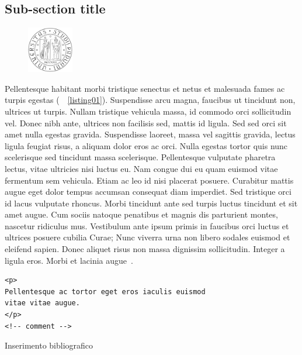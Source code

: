 \documentclass[a4paper,12pt,twoside,openright]{book}
\begin{document}
\subsection{Sub-section title}
\begin{figure}
  \vspace{-20pt}
  \begin{center}
  \includegraphics[width=2cm]{images/unipd-bn}
  \end{center}
  \vspace{-10pt}
\end{figure}

Pellentesque habitant morbi tristique senectus et netus et malesuada fames ac turpis egestas (\seename\ \lstlistingname~\ref{listing01}). Suspendisse arcu magna, faucibus ut tincidunt non, ultrices ut turpis. Nullam tristique vehicula massa, id commodo orci sollicitudin vel. Donec nibh ante, ultrices non facilisis sed, mattis id ligula. Sed sed orci sit amet nulla egestas gravida. Suspendisse laoreet, massa vel sagittis gravida, lectus ligula feugiat risus, a aliquam dolor eros ac orci. Nulla egestas tortor quis nunc scelerisque sed tincidunt massa scelerisque. Pellentesque vulputate pharetra lectus, vitae ultricies nisi luctus eu. Nam congue dui eu quam euismod vitae fermentum sem vehicula. Etiam ac leo id nisi placerat posuere. Curabitur mattis augue eget dolor tempus accumsan consequat diam imperdiet. Sed tristique orci id lacus vulputate rhoncus. Morbi tincidunt ante sed turpis luctus tincidunt et sit amet augue. Cum sociis natoque penatibus et magnis dis parturient montes, nascetur ridiculus mus. Vestibulum ante ipsum primis in faucibus orci luctus et ultrices posuere cubilia Curae; Nunc viverra urna non libero sodales euismod et eleifend sapien. Donec aliquet risus non massa dignissim sollicitudin. Integer a ligula eros. Morbi et lacinia augue~\cite{bookname}.

\begin{lstlisting}[caption={caption text},label=listing01]
<p>
Pellentesque ac tortor eget eros iaculis euismod
vitae vitae augue.
</p>
<!-- comment -->
\end{lstlisting}

Inserimento bibliografico  \cite{9171875} \cite{4557629} \cite{4024975}

 

\backmatter

\begingroup %
  \makeatletter
  \let\ps@plain\ps@empty
  \makeatother
  
\endgroup
\end{document}
